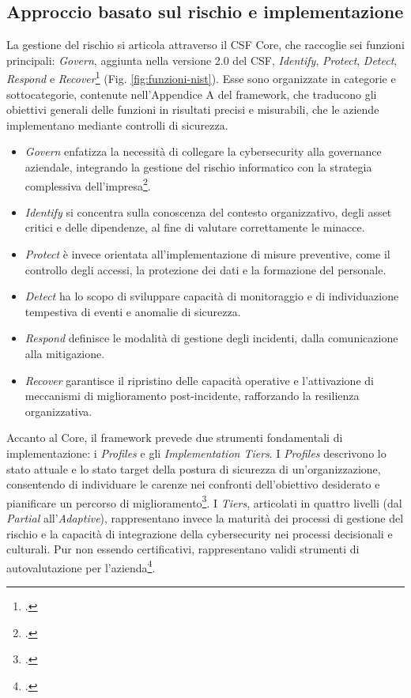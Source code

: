 \subsection{Approccio basato sul rischio e implementazione}
La gestione del rischio si articola attraverso il CSF Core, che raccoglie sei funzioni principali: 
\textit{Govern}, aggiunta nella versione 2.0 del CSF,
\textit{Identify}, \textit{Protect}, \textit{Detect}, \textit{Respond} e \textit{Recover}\footcite[p. 5]{nist-csf} (Fig. \ref{fig:funzioni-nist}). 
Esse sono organizzate in categorie e sottocategorie, contenute nell'Appendice A del framework,
che traducono gli obiettivi generali delle funzioni in risultati precisi e misurabili, che le aziende
implementano mediante controlli di sicurezza.
\begin{itemize}
    \item \textit{Govern} enfatizza la necessità di collegare la cybersecurity alla governance aziendale, 
    integrando la gestione del rischio informatico con la strategia complessiva dell’impresa\footcite[p. 8]{nist-csf}.
    \item \textit{Identify} si concentra sulla conoscenza del contesto organizzativo, degli asset critici e delle 
    dipendenze, al fine di valutare correttamente le minacce.
    \item \textit{Protect} è invece orientata all’implementazione di misure preventive, 
    come il controllo degli accessi, la protezione dei dati e la formazione del personale.
    \item \textit{Detect} ha lo scopo di sviluppare capacità di monitoraggio e di individuazione tempestiva 
    di eventi e anomalie di sicurezza.
    \item \textit{Respond} definisce le modalità di gestione degli incidenti, dalla comunicazione alla mitigazione.
    \item \textit{Recover} garantisce il ripristino delle capacità operative e l’attivazione di meccanismi di 
    miglioramento post-incidente, rafforzando la resilienza organizzativa.
\end{itemize}

Accanto al Core, il framework prevede due strumenti fondamentali di implementazione: i 
\textit{Profiles} e gli \textit{Implementation Tiers}. I \textit{Profiles} descrivono lo stato attuale e lo stato 
target della postura di sicurezza di un’organizzazione, consentendo di individuare le carenze nei confronti dell'obiettivo desiderato e 
pianificare un percorso di miglioramento\footcite[p. 6]{nist-csf}. I \textit{Tiers}, articolati in quattro livelli 
(dal \textit{Partial} all’\textit{Adaptive}), rappresentano invece la maturità dei processi di gestione del rischio 
e la capacità di integrazione della cybersecurity nei processi decisionali e culturali. Pur non essendo 
certificativi, rappresentano validi strumenti di autovalutazione per l'azienda\footcite[p. 7]{nist-csf}. 

